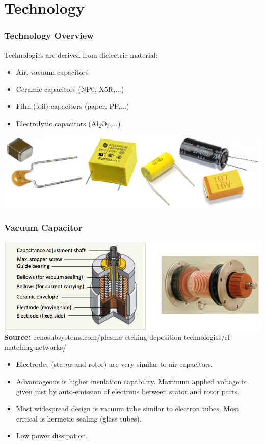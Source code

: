 \documentclass{beamer}
\begin{document}
\section{\texorpdfstring{Technology}{Technology}}
	\begin{frame}
    \frametitle{Technology Overview}
		Technologies are derived from dielectric material:
		
		\begin{itemize}
			\item Air, vacuum capacitors
			\item Ceramic capacitors (NP0, X5R,...)
			\item Film (foil) capacitors (paper, PP,...)
			\item Electrolytic capacitors (Al$_2$O$_3$,...)
		\end{itemize}
		\begin{center}
			\includegraphics[scale=0.35]{obr02_kondenzatory.png}
		\end{center}
  \end{frame}
	\begin{frame}
    \frametitle{Vacuum Capacitor}
		\begin{center}
			\includegraphics[scale=0.38]{obr03_vakuovyKond.png}\\
			
			\tiny{\textbf{Source:}~renosubsystems.com/plasma-etching-deposition-technologies/rf-matching-networks/}
		\end{center}
		\small
		
		\begin{itemize}
			\item Electrodes (stator and rotor) are very similar to air capacitors.
			\item Advantageous is higher insulation capability. Maximum applied voltage is given just by auto-emission of electrons between stator and rotor parts.
			\item Most widespread design is vacuum tube similar to electron tubes.  Most critical is hermetic sealing (glass tubes).
			\item Low power dissipation.
		\end{itemize}
  \end{frame}
\end{document}
